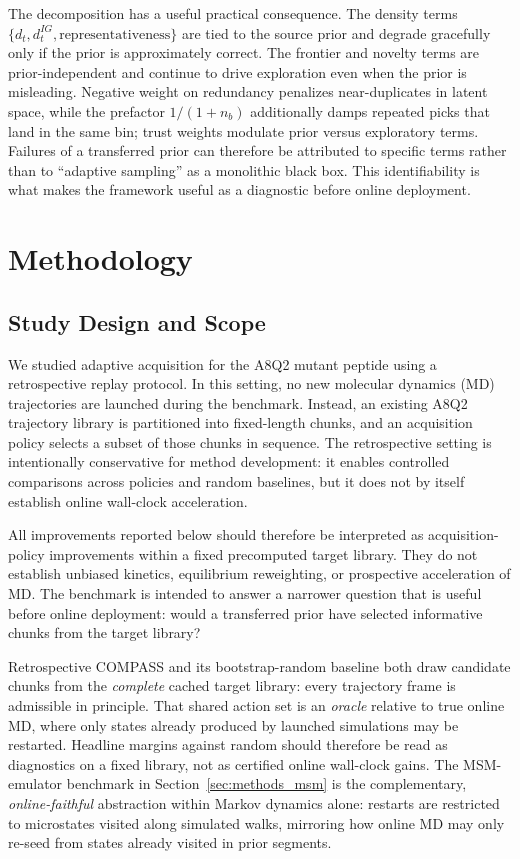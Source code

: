 \documentclass[journal=jctcce,manuscript=article,layout=twocolumn]{achemso}
\begin{document}
The decomposition has a useful practical consequence. The density terms $\{d_t,d^{IG}_t,\text{representativeness}\}$ are tied to the source prior and degrade gracefully only if the prior is approximately correct. The frontier and novelty terms are prior-independent and continue to drive exploration even when the prior is misleading. Negative weight on redundancy penalizes near-duplicates in latent space, while the prefactor $1/(1+n_b)$ additionally damps repeated picks that land in the same bin; trust weights modulate prior versus exploratory terms. Failures of a transferred prior can therefore be attributed to specific terms rather than to ``adaptive sampling'' as a monolithic black box. This identifiability is what makes the framework useful as a diagnostic before online deployment.

\section{Methodology}

\subsection{Study Design and Scope}

We studied adaptive acquisition for the A8Q2 mutant peptide using a retrospective replay protocol. In this setting, no new molecular dynamics (MD) trajectories are launched during the benchmark. Instead, an existing A8Q2 trajectory library is partitioned into fixed-length chunks, and an acquisition policy selects a subset of those chunks in sequence. The retrospective setting is intentionally conservative for method development: it enables controlled comparisons across policies and random baselines, but it does not by itself establish online wall-clock acceleration.

All improvements reported below should therefore be interpreted as acquisition-policy improvements within a fixed precomputed target library. They do not establish unbiased kinetics, equilibrium reweighting, or prospective acceleration of MD. The benchmark is intended to answer a narrower question that is useful before online deployment: would a transferred prior have selected informative chunks from the target library?

Retrospective COMPASS and its bootstrap-random baseline both draw candidate chunks from the \emph{complete} cached target library: every trajectory frame is admissible in principle. That shared action set is an \emph{oracle} relative to true online MD, where only states already produced by launched simulations may be restarted. Headline margins against random should therefore be read as diagnostics on a fixed library, not as certified online wall-clock gains. The MSM-emulator benchmark in Section~\ref{sec:methods_msm} is the complementary, \emph{online-faithful} abstraction within Markov dynamics alone: restarts are restricted to microstates visited along simulated walks, mirroring how online MD may only re-seed from states already visited in prior segments.
\end{document}
